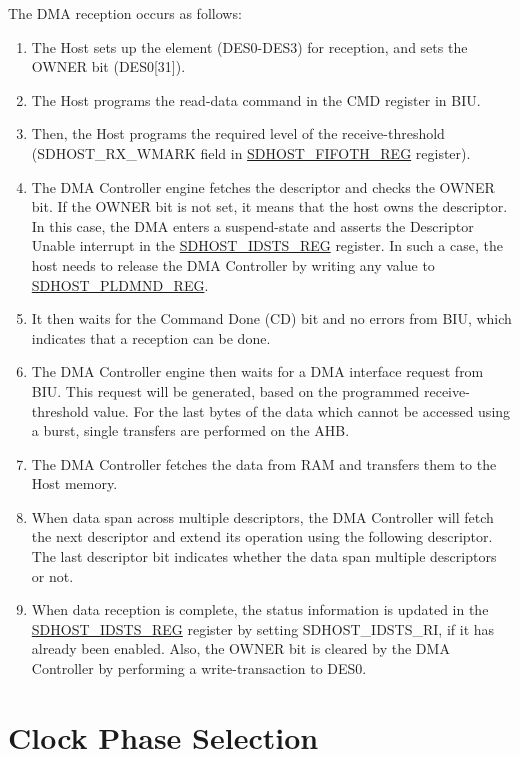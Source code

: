 \documentclass[main\_\_EN.tex]{subfiles}
\begin{document}
The DMA  reception occurs as follows:

\begin{enumerate}
\item The Host sets up the element (DES0-DES3) for reception, and sets the OWNER bit (DES0[31]).
\item The Host programs the read-data command in the CMD register in BIU.
\item Then, the Host programs the required level of the receive-threshold (SDHOST\_RX\_WMARK field in \hyperref[regdesc:FIFOTHREG]{SDHOST\_FIFOTH\_REG} register).
\item The DMA Controller engine fetches the descriptor and checks the OWNER bit. If the OWNER bit is not set, it means that the host owns the descriptor. In this case, the DMA enters a suspend-state and asserts the Descriptor Unable interrupt in the \hyperref[regdesc:IDSTSREG]{SDHOST\_IDSTS\_REG} register. In such a case, the host needs to release the DMA Controller by writing any value to \hyperref[regdesc:PLDMNDREG]{SDHOST\_PLDMND\_REG}.
\item It then waits for the Command Done (CD) bit and no errors from BIU, which indicates that a reception can be done.
\item The DMA Controller engine then waits for a DMA interface request from BIU. This request will be generated, based on the programmed receive-threshold value. For the last bytes of the data which cannot be accessed using a burst, single transfers are performed on the AHB.
\item The DMA Controller fetches the data from RAM and transfers them to the Host memory.
\item When data span across multiple descriptors, the DMA Controller will fetch the next descriptor and extend its operation using the following descriptor. The last descriptor bit indicates whether the data span multiple descriptors or not.
\item When data reception is complete, the status information is updated in the \hyperref[regdesc:IDSTSREG]{SDHOST\_IDSTS\_REG} register by setting SDHOST\_IDSTS\_RI, if it has already been enabled. Also, the OWNER bit is cleared by the DMA Controller by performing a write-transaction to DES0.
\end{enumerate}

\section{Clock Phase Selection}\label{sec:sdhost-phase-selection}
\end{document}

